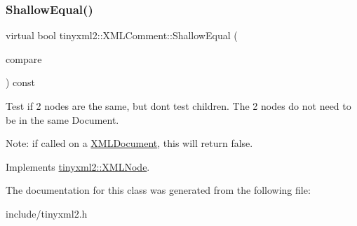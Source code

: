 \subsubsection{\texorpdfstring{ShallowEqual()}{ShallowEqual()}}
{\footnotesize\ttfamily virtual bool tinyxml2\+::\+X\+M\+L\+Comment\+::\+Shallow\+Equal (\begin{DoxyParamCaption}\item[{const \mbox{\hyperlink{classtinyxml2_1_1XMLNode}{X\+M\+L\+Node}} $\ast$}]{compare }\end{DoxyParamCaption}) const\hspace{0.3cm}{\ttfamily [virtual]}}

Test if 2 nodes are the same, but don\textquotesingle{}t test children. The 2 nodes do not need to be in the same Document.

Note\+: if called on a \mbox{\hyperlink{classtinyxml2_1_1XMLDocument}{X\+M\+L\+Document}}, this will return false. 

Implements \mbox{\hyperlink{classtinyxml2_1_1XMLNode_a7ce18b751c3ea09eac292dca264f9226}{tinyxml2\+::\+X\+M\+L\+Node}}.



The documentation for this class was generated from the following file\+:\begin{DoxyCompactItemize}
\item 
include/tinyxml2.\+h\end{DoxyCompactItemize}
